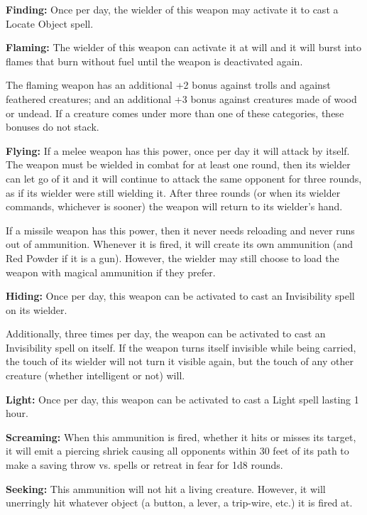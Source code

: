 \begin{multicols*}{2}
\textbf{Finding:} Once per day, the wielder of this weapon may activate it to cast a Locate Object spell.

\textbf{Flaming:} The wielder of this weapon can activate it at will and it will burst into flames that burn without fuel until the weapon is deactivated again.

The flaming weapon has an additional +2 bonus against trolls and against feathered creatures; and an additional +3 bonus against creatures made of wood or undead. If a creature comes under more than one of these categories, these bonuses do not stack.

\textbf{Flying:} If a melee weapon has this power, once per day it will attack by itself. The weapon must be wielded in combat for at least one round, then its wielder can let go of it and it will continue to attack the same opponent for three rounds, as if its wielder were still wielding it. After three rounds (or when its wielder commands, whichever is sooner) the weapon will return to its wielder’s hand.

If a missile weapon has this power, then it never needs reloading and never runs out of ammunition. Whenever it is fired, it will create its own ammunition (and Red Powder if it is a gun). However, the wielder may still choose to load the weapon with magical ammunition if they prefer.

\textbf{Hiding:} Once per day, this weapon can be activated to cast an Invisibility spell on its wielder.

Additionally, three times per day, the weapon can be activated to cast an Invisibility spell on itself. If the weapon turns itself invisible while being carried, the touch of its wielder will not turn it visible again, but the touch of any other creature (whether intelligent or not) will.

\textbf{Light:} Once per day, this weapon can be activated to cast a Light spell lasting 1 hour.

\textbf{Screaming:} When this ammunition is fired, whether it hits or misses its target, it will emit a piercing shriek causing all opponents within 30 feet of its path to make a saving throw vs. spells or retreat in fear for 1d8 rounds.

\textbf{Seeking:} This ammunition will not hit a living creature. However, it will unerringly hit whatever object (a button, a lever, a trip-wire, etc.) it is fired at.


\end{multicols*}
